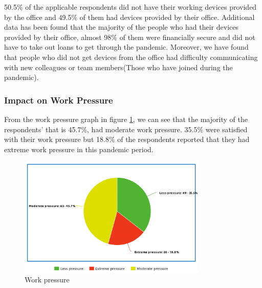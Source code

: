 \documentclass[11pt]{article}
\begin{document}
50.5\% of the applicable respondents did not have their working devices provided by the office and 49.5\% of them had devices provided by their office. Additional data has been found that the majority of the people who had their devices provided by their office, almost 98\% of them were financially secure and did not have to take out loans to get through the pandemic. Moreover, we have found that people who did not get devices from the office had difficulty communicating with new colleagues or team members(Those who have joined during the pandemic). 


\subsubsection{Impact on Work Pressure}
From the work pressure graph in figure \ref{pressure}, we can see that the majority of the respondents’ that is 45.7\%, had moderate work pressure. 35.5\% were satisfied with their work pressure but 18.8\% of the respondents reported that they had extreme work pressure in this pandemic period.

\begin{figure}[!ht]
	\centering
	\includegraphics[width=0.8\textwidth]{Images/Experience/work-pressure.png}
	\caption{Work pressure}
	\centering
	\label{pressure}
\end{figure}
\end{document}
